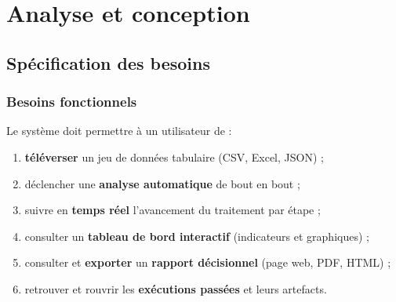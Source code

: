 \chapter{Analyse et conception}
\label{chap:conception}


\section{Spécification des besoins}

\subsection{Besoins fonctionnels}
Le système doit permettre à un utilisateur de :
\begin{enumerate}
  \item \textbf{téléverser} un jeu de données tabulaire (CSV, Excel, JSON) ;
  \item déclencher une \textbf{analyse automatique} de bout en bout ;
  \item suivre en \textbf{temps réel} l'avancement du traitement par étape ;
  \item consulter un \textbf{tableau de bord interactif} (indicateurs et
        graphiques) ;
  \item consulter et \textbf{exporter} un \textbf{rapport décisionnel}
        (page web, PDF, HTML) ;
  \item retrouver et rouvrir les \textbf{exécutions passées} et leurs
        artefacts.
\end{enumerate}

